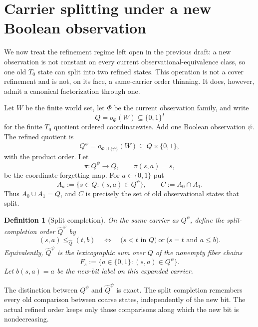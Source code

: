 \documentclass[11pt]{article}
\newtheorem{definition}[theorem]{Definition}
\begin{document}
\section{Carrier splitting under a new Boolean observation}\label{sec:carrier-splitting}

We now treat the refinement regime left open in the previous draft: a new
observation is not constant on every current observational-equivalence class, so
one old $T_0$ state can split into two refined states.  This operation is not a
cover refinement and is not, on its face, a same-carrier order thinning.  It does,
however, admit a canonical factorization through one.

Let $W$ be the finite world set, let $\Phi$ be the current observation family,
and write
\[
 Q=o_\Phi(W)\subseteq\{0,1\}^{I}
\]
for the finite $T_0$ quotient ordered coordinatewise.  Add one Boolean
observation $\psi$.  The refined quotient is
\[
 Q^\psi=o_{\Phi\cup\{\psi\}}(W)
 \subseteq Q\times\{0,1\},
\]
with the product order.  Let
\[
 \pi:Q^\psi\longrightarrow Q,
 \qquad \pi(s,a)=s,
\]
be the coordinate-forgetting map.  For $a\in\{0,1\}$ put
\[
 A_a:=\{s\in Q:(s,a)\in Q^\psi\},
 \qquad C:=A_0\cap A_1.
\]
Thus $A_0\cup A_1=Q$, and $C$ is precisely the set of old observational
states that split.

\begin{definition}[Split completion]
On the same carrier as $Q^\psi$, define the split-completion order
$\widehat Q^\psi$ by
\[
 (s,a)\leq_{\widehat Q}(t,b)
 \quad\Longleftrightarrow\quad
 \bigl(s<t\text{ in }Q\bigr)
 \ \text{or}\ 
 \bigl(s=t\text{ and }a\leq b\bigr).
\]
Equivalently, $\widehat Q^\psi$ is the lexicographic sum over $Q$ of the
nonempty fiber chains
\[
 F_s:=\{a\in\{0,1\}:(s,a)\in Q^\psi\}.
\]
Let $b(s,a)=a$ be the new-bit label on this expanded carrier.
\end{definition}

The distinction between $Q^\psi$ and $\widehat Q^\psi$ is exact.  The split
completion remembers every old comparison between coarse states, independently
of the new bit.  The actual refined order keeps only those comparisons along
which the new bit is nondecreasing.
\end{document}
